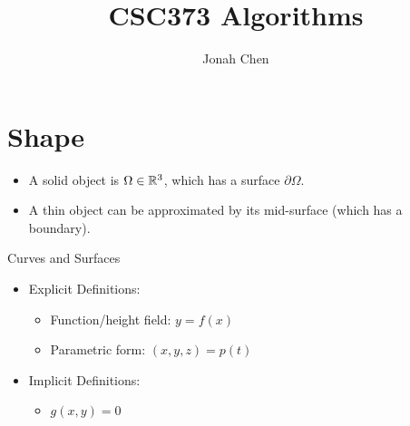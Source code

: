 \documentclass[a4paper]{article}
\title{CSC373 Algorithms}
\author{Jonah Chen}
\date{}
\begin{document}
\maketitle
\sffamily

\section{Shape}
\begin{itemize}
    \item A solid object is $\Omega\in\mathbb{R}^3$, which has a surface $\partial\Omega$.
    \item A thin object can be approximated by its mid-surface (which has a boundary).
\end{itemize}
Curves and Surfaces
\begin{itemize}
    \item Explicit Definitions:
    \begin{itemize}
        \item Function/height field: $y=f(x)$
        \item Parametric form: $(x,y,z) = p(t)$
    \end{itemize}
    \item Implicit Definitions:
    \begin{itemize}
        \item $g(x,y)=0$
    \end{itemize}
\end{itemize}
\end{document}
